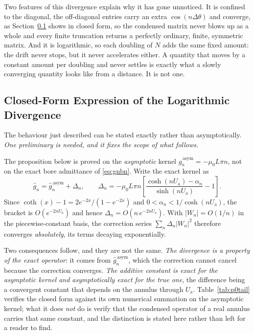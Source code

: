 \documentclass[10pt,a4paper,twocolumn]{article}
\newcommand{\Ua}{U_{\mathrm{a}}}
\theoremstyle{plain}
\theoremstyle{remark}
\begin{document}
Two features of this divergence explain why it has gone unnoticed. It is
confined to the diagonal, the off-diagonal entries carry an extra
$\cos(n\Delta\theta)$ and converge, as Section~\ref{sub:p0closed} shows
in closed form, so the condensed matrix never blows up as a whole and
every finite truncation returns a perfectly ordinary, finite, symmetric
matrix. And it is logarithmic, so each doubling of $N$ adds the same
fixed amount: the drift never stops, but it never accelerates either.
A quantity that moves by a constant amount per doubling and never
settles is exactly what a slowly converging quantity looks like from a
distance. It is not one.

\subsection{Closed-Form Expression of the Logarithmic Divergence}
\label{sub:p0closed}

The behaviour just described can be stated exactly rather than
asymptotically. \emph{One preliminary is needed, and it fixes the scope
of what follows.}

The proposition below is proved on the \emph{asymptotic} kernel
$\hat{g}_n^{\,\mathrm{asym}}=-\mu_0L\pi n$, not on the exact bore
admittance of \eqref{eq:gnbn}. Write the exact kernel as
\begin{equation}
\hat{g}_n=\hat{g}_n^{\,\mathrm{asym}}+\Delta_n,
\qquad
\Delta_n=-\mu_0L\pi n\left[\frac{\cosh(n\Ua)-\alpha_n}{\sinh(n\Ua)}-1\right].
\label{eq:kernelsplit}
\end{equation}
Since $\coth(x)-1=2e^{-2x}/(1-e^{-2x})$ and
$0<\alpha_n<1/\cosh(n\Ua)$, the bracket is $O(e^{-2n\Ua})$ and hence
$\Delta_n=O\!\left(n\,e^{-2n\Ua}\right)$. With $|W_n|=O(1/n)$ in the
piecewise-constant basis, the correction series
$\sum_n \Delta_n|W_n|^2$ therefore converges \emph{absolutely}, its terms
decaying exponentially.

Two consequences follow, and they are not the same. \emph{The divergence
is a property of the exact operator}: it comes from
$\hat{g}_n^{\,\mathrm{asym}}$, which the correction cannot cancel because
the correction converges. \emph{The additive constant is exact for the
asymptotic kernel and asymptotically exact for the true one}, the
difference being a convergent constant that depends on the annulus
through $\Ua$. Table~\ref{tab:p0tail} verifies the closed form against
its own numerical summation on the asymptotic kernel; what it does
\emph{not} do is verify that the condensed operator of a real annulus
carries that same constant, and the distinction is stated here rather
than left for a reader to find.
\end{document}
